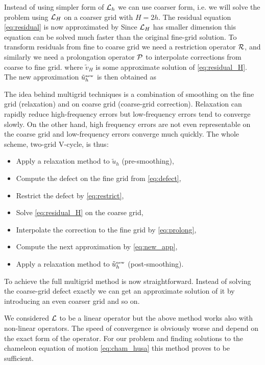 Instead of using simpler form of $\mathcal{L}_h$ we can use coarser form, i.e. we will solve the problem using $\mathcal{L}_H$ on a coarser grid with $H=2h$. The residual equation \eqref{eq:residual} is now approximated by
Since $\mathcal{L}_H$ has smaller dimension this equation can be solved much faster than the original fine-grid solution. To transform residuals from fine to coarse grid we need a restriction operator $\mathcal{R}$, and similarly we need a  prolongation operator $\mathcal{P}$ to interpolate corrections from coarse to fine grid.
where $\tilde v_H$ is some approximate solution of \eqref{eq:residual_H}. The new approximation $\tilde u_h^\text{\tiny new}$ is then obtained as

The idea behind multigrid techniques is a combination of smoothing on the fine grid (relaxation) and on coarse grid (coarse-grid correction). Relaxation can rapidly reduce high-frequency errors but low-frequency errors tend to converge slowly. On the other hand, high frequency errors are not even representable on the coarse grid and low-frequency errors converge much quickly. The whole scheme, two-grid V-cycle, is thus:
\begin{itemize}
    \item Apply a relaxation method to $\tilde u_h$ (pre-smoothing),
    \item Compute the defect on the fine grid from \eqref{eq:defect},
    \item Restrict the defect by \eqref{eq:restrict},
    \item Solve \eqref{eq:residual_H} on the coarse grid,
    \item Interpolate the correction to the fine grid by \eqref{eq:prolong},
    \item Compute the next approximation by \eqref{eq:new_app},
    \item Apply a relaxation method to $\tilde u_h^\text{\tiny new}$ (post-smoothing).
\end{itemize}
To achieve the full multigrid method is now straightforward. Instead of solving the coarse-grid defect exactly we can get an approximate solution of it by introducing an even coarser grid and so on.

We considered $\mathcal{L}$ to be a linear operator but the above method works also with non-linear operators. The speed of convergence is obviously worse and depend on the exact form of the operator. For our problem and finding solutions to the chameleon equation of motion \eqref{eq:cham_husa} this method proves to be sufficient.

